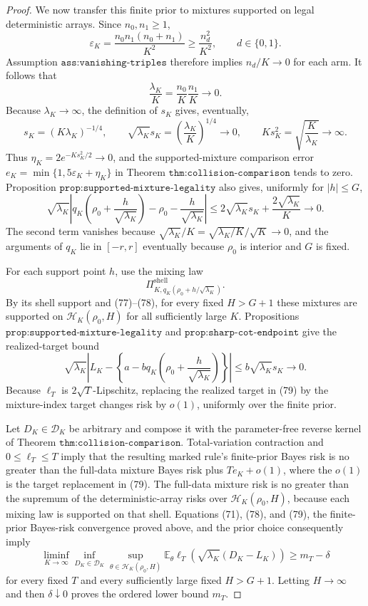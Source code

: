 \documentclass{article}
\begin{document}
\begin{proof}
We now transfer this finite prior to mixtures supported on legal
deterministic arrays.  Since \(n_0,n_1\ge1\),
\[
 \varepsilon_K
 =\frac{n_0n_1(n_0+n_1)}{K^2}
 \ge \frac{n_d^2}{K^2},\qquad d\in\{0,1\}.
\]
Assumption \(\texttt{ass:vanishing-triples}\) therefore implies
\(n_d/K\to0\) for each arm.  It follows that
\[
 \frac{\lambda_K}{K}
 =\frac{n_0}{K}\frac{n_1}{K}\longrightarrow0.
\]
Because \(\lambda_K\to\infty\), the definition of \(s_K\) gives,
eventually,
\[
 s_K=(K\lambda_K)^{-1/4},\qquad
 \sqrt{\lambda_K}s_K
 =\left(\frac{\lambda_K}{K}\right)^{1/4}\to0,
 \qquad
 Ks_K^2=\sqrt{\frac K{\lambda_K}}\to\infty.
 \tag{77}
\]
Thus \(\eta_K=2e^{-Ks_K^2/2}\to0\), and the supported-mixture
comparison error \(e_K=\min\{1,5\varepsilon_K+\eta_K\}\) in Theorem
\(\texttt{thm:collision-comparison}\) tends to zero.  Proposition
\(\texttt{prop:supported-mixture-legality}\) also gives, uniformly for
\(|h|\le G\),
\[
 \sqrt{\lambda_K}\left|
 q_K\!\left(\rho_0+\frac h{\sqrt{\lambda_K}}\right)
 -\rho_0-\frac h{\sqrt{\lambda_K}}
 \right|
 \le2\sqrt{\lambda_K}s_K+\frac{2\sqrt{\lambda_K}}K
 \longrightarrow0.
 \tag{78}
\]
The second term vanishes because
\(\sqrt{\lambda_K}/K=\sqrt{\lambda_K/K}/\sqrt K\to0\), and the arguments
of \(q_K\) lie in \([-r,r]\) eventually because \(\rho_0\) is interior
and \(G\) is fixed.

For each support point \(h\), use the mixing law
\[
 \Pi_{K,q_K(\rho_0+h/\sqrt{\lambda_K})}^{\mathrm{shell}}.
\]
By its shell support and (77)--(78), for every fixed \(H>G+1\) these
mixtures are supported on \(\mathcal H_K(\rho_0,H)\) for all sufficiently
large \(K\).  Propositions
\(\texttt{prop:supported-mixture-legality}\) and
\(\texttt{prop:sharp-cot-endpoint}\) give the realized-target bound
\[
 \sqrt{\lambda_K}\left|
 L_K-\left\{a-bq_K\!\left(\rho_0+
 \frac h{\sqrt{\lambda_K}}\right)\right\}
 \right|
 \le b\sqrt{\lambda_K}s_K\longrightarrow0.
 \tag{79}
\]
Because \(\ell_T\) is \(2\sqrt T\)-Lipschitz, replacing the realized
target in (79) by the mixture-index target changes risk by \(o(1)\),
uniformly over the finite prior.

Let \(D_K\in\mathscr D_K\) be arbitrary and compose it with the
parameter-free reverse kernel of Theorem
\(\texttt{thm:collision-comparison}\).  Total-variation contraction and
\(0\le\ell_T\le T\) imply that the resulting marked rule's finite-prior
Bayes risk is no greater than the full-data mixture Bayes risk plus
\(Te_K+o(1)\), where the \(o(1)\) is the target replacement in (79).
The full-data mixture risk is no greater than the supremum of the
deterministic-array risks over \(\mathcal H_K(\rho_0,H)\), because each
mixing law is supported on that shell.  Equations (71), (78), and (79),
the finite-prior Bayes-risk convergence proved above, and the prior
choice consequently imply
\[
 \liminf_{K\to\infty}
 \inf_{D_K\in\mathscr D_K}
 \sup_{\theta\in\mathcal H_K(\rho_0,H)}
 \mathbb E_\theta\ell_T\!\left(
 \sqrt{\lambda_K}(D_K-L_K)\right)
 \ge m_T-\delta
 \tag{80}
\]
for every fixed \(T\) and every sufficiently large fixed \(H>G+1\).
Letting \(H\to\infty\) and then \(\delta\downarrow0\) proves the ordered
lower bound \(m_T\).


\end{proof}
\end{document}
